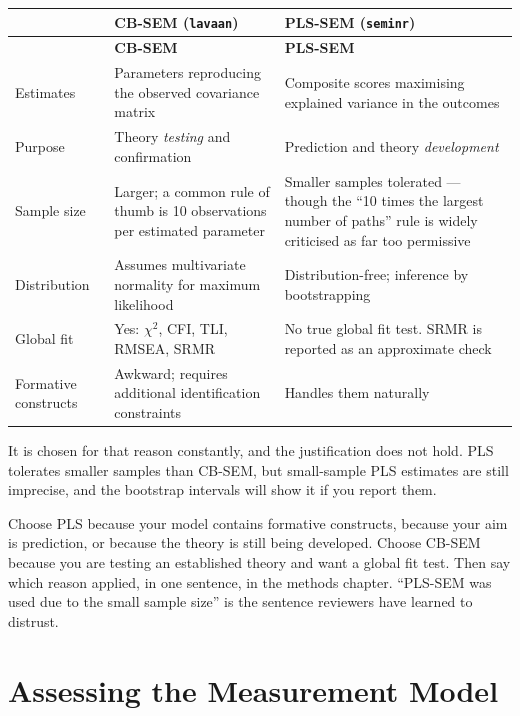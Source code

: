 \begin{center}
\small
\begin{longtable}{@{}L{2.8cm}L{5.3cm}L{5.7cm}@{}}
\toprule
 & \textbf{CB-SEM} (\texttt{lavaan}) & \textbf{PLS-SEM} (\texttt{seminr}) \\
\midrule
\endfirsthead
\toprule
 & \textbf{CB-SEM} & \textbf{PLS-SEM} \\
\midrule
\endhead
\bottomrule
\endfoot
Estimates
  & Parameters reproducing the observed covariance matrix
  & Composite scores maximising explained variance in the outcomes \\
Purpose
  & Theory \emph{testing} and confirmation
  & Prediction and theory \emph{development} \\
Sample size
  & Larger; a common rule of thumb is 10 observations per estimated parameter
  & Smaller samples tolerated --- though the ``10 times the largest number of
    paths'' rule is widely criticised as far too permissive \\
Distribution
  & Assumes multivariate normality for maximum likelihood
  & Distribution-free; inference by bootstrapping \\
Global fit
  & Yes: $\chi^2$, CFI, TLI, RMSEA, SRMR
  & No true global fit test. SRMR is reported as an approximate check \\
Formative constructs
  & Awkward; requires additional identification constraints
  & Handles them naturally \\
\end{longtable}
\end{center}

\begin{pitfall}
It is chosen for that reason constantly, and the justification does not hold.
PLS tolerates smaller samples than CB-SEM, but small-sample PLS estimates are
still imprecise, and the bootstrap intervals will show it if you report them.

\medskip
Choose PLS because your model contains formative constructs, because your aim
is prediction, or because the theory is still being developed. Choose CB-SEM
because you are testing an established theory and want a global fit test. Then
say which reason applied, in one sentence, in the methods chapter. ``PLS-SEM
was used due to the small sample size'' is the sentence reviewers have learned
to distrust.
\end{pitfall}

\section{Assessing the Measurement Model}

